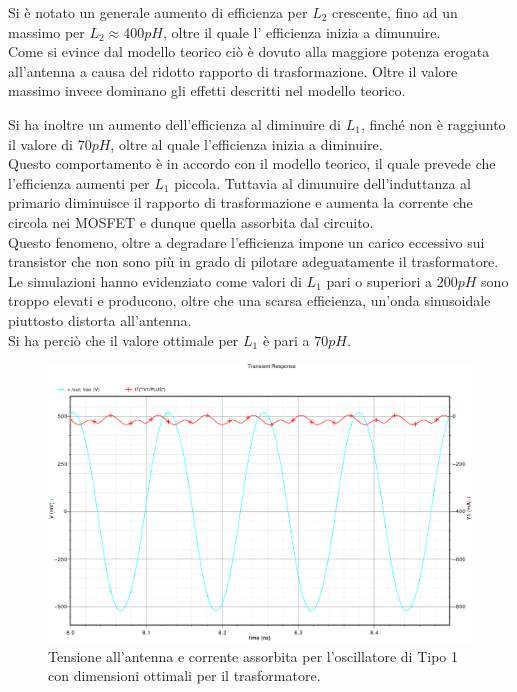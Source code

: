 \documentclass[a4paper, 12pt]{memoir}
\begin{document}
Si è notato un generale aumento di efficienza per $L_2$ crescente, fino ad un
massimo per $L_2 \approx 400pH$, oltre il quale l' efficienza inizia a
dimunuire.\\
Come si evince dal modello teorico ciò è dovuto alla maggiore potenza erogata
all'antenna a causa del ridotto rapporto di trasformazione. Oltre il valore
massimo invece dominano gli effetti descritti nel modello teorico.

Si ha inoltre un aumento dell'efficienza al diminuire di $L_1$, finché non è
raggiunto il valore di $70pH$, oltre al quale l'efficienza inizia a diminuire.
\\Questo comportamento è in accordo con il modello teorico, il quale prevede
che l'efficienza aumenti per $L_1$ piccola.  Tuttavia al dimunuire 
dell'induttanza al primario diminuisce il rapporto di trasformazione e aumenta
la corrente che circola nei MOSFET e dunque quella assorbita dal circuito.\\
Questo fenomeno, oltre a degradare l'efficienza impone un carico eccessivo sui
transistor che non sono più in grado di pilotare adeguatamente il trasformatore.
Le simulazioni hanno evidenziato come valori di $L_1$ pari o superiori a $200pH$
sono troppo elevati e producono, oltre che una scarsa efficienza, un'onda
sinusoidale piuttosto distorta all'antenna.\\
Si ha perciò che il valore ottimale per $L_1$ è pari a $70pH$.
\begin{figure}[h!]
\centering
\includegraphics[width=\textwidth]{images/Vant-It.pdf}
\caption{Tensione all'antenna e corrente assorbita per l'oscillatore di Tipo 1
      con dimensioni ottimali per il trasformatore.}
\end{figure}
\clearpage
\end{document}
